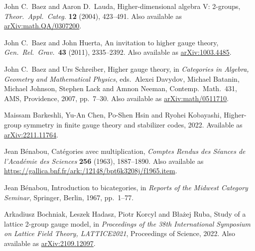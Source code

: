 \documentclass[reqno,12pt]{amsart}
\theoremstyle{definition}
\begin{document}
\begin{thebibliography}{99}
\raggedright

John C.\ Baez and Aaron D.\ Lauda, Higher-dimensional algebra {V}: 2-groups, \textsl{Theor.\ Appl.\ Categ.} \textbf{12} (2004), 423--491.
Also available as \href{https://arxiv.org/abs/math.QA/0307200}{arXiv:math.QA/0307200}.

John C.\ Baez and John Huerta, An invitation to higher gauge theory, 
\textsl{Gen.\ Rel.\ Grav.\ }\textbf{43} (2011), 2335--2392.   Also available
as \href{https://arxiv.org/abs/1003.4485}{arXiv:1003.4485}.


John C.\ Baez and Urs Schreiber, Higher gauge theory, in 
\textsl{Categories in Algebra, Geometry and Mathematical Physics}, eds.\ Alexei Davydov, Michael Batanin, Michael Johnson, Stephen Lack and Amnon Neeman, Contemp.\ Math.\ 431, AMS, Providence, 2007, pp.\ 7--30. 
Also available as \href{https://arxiv.org/abs/math/0511710}{arXiv:math/0511710}.

Maissam Barkeshli, Yu-An Chen, Po-Shen Hsin and Ryohei Kobayashi,
Higher-group symmetry in finite gauge theory and stabilizer codes, 2022.
Available as \href{https://arxiv.org/abs/2211.11764}{arXiv:2211.11764}.

Jean B\'enabou, Cat\'egories avec multiplication, \textsl{Comptes Rendus des S\'eances de l'Acad\'emie des Sciences} \textbf{256} (1963), 1887--1890.
Also available as \href{https://gallica.bnf.fr/ark:/12148/bpt6k3208j/f1965.item}{https://gallica.bnf.fr/ark:/12148/bpt6k3208j/f1965.item}.

Jean B{\'e}nabou, Introduction to bicategories, in
\textsl{Reports of the Midwest Category Seminar}, Springer, Berlin,
1967, pp.\ 1--77.

Arkadiusz Bochniak, Leszek Hadasz, Piotr Korcyl and B\l ażej Ruba,
Study of a lattice 2-group gauge model, in \textsl{Proceedings of the 38th International Symposium on Lattice Field Theory, LATTICE2021}, Proceedings of Science, 2022.  Also available as \href{https://arxiv.org/abs/2109.12097}{arXiv:2109.12097}.


\end{thebibliography}
\end{document}
